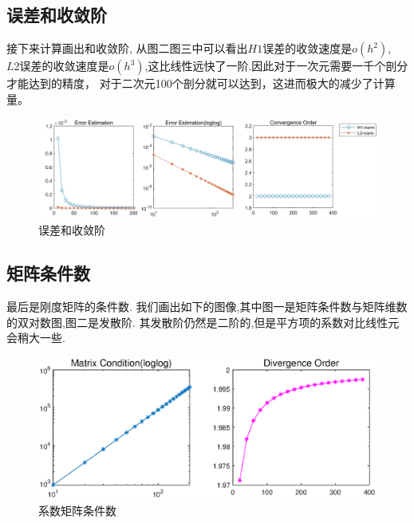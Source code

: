 \documentclass[11pt,reqno]{article}
\numberwithin{equation}{section}
\begin{document}
\subsection{误差和收敛阶}
接下来计算画出和收敛阶, 从图二图三中可以看出$H1$误差的收敛速度是$o(h^2)$,\ 
$L2$误差的收敛速度是$o(h^3)$,这比线性远快了一阶.因此对于一次元需要一千个剖分才能达到的精度，
对于二次元100个剖分就可以达到，这进而极大的减少了计算量。
\begin{figure}[h]
	\centering
	\includegraphics[width=\textwidth]{Error.jpg}
	\caption{误差和收敛阶}
\end{figure}

\newpage

\subsection{矩阵条件数}
最后是刚度矩阵的条件数. 我们画出如下的图像,其中图一是矩阵条件数与矩阵维数的双对数图,图二是发散阶.
其发散阶仍然是二阶的,但是平方项的系数对比线性元会稍大一些.
\begin{figure}[h]
	\centering
	\includegraphics[width=\textwidth]{Condition.eps}
	\caption{系数矩阵条件数}
\end{figure}
\end{document}

